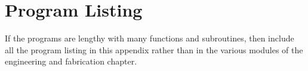 
\chapter{Program Listing}

If the programs are lengthy with many functions and subroutines, then
include all the program listing in this appendix rather than in the
various modules of the engineering and fabrication chapter.
